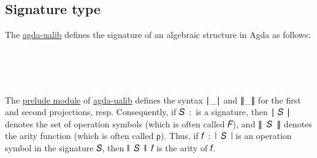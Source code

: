 \documentclass[sigplan,screen]{acmart}
\newcommand\signatureOV{\AgdaFunction{Signature}\AgdaSpace{}\AgdaBound{𝓞}\AgdaSpace{}\AgdaBound{𝓥}}
\newcommand\preludemodule{\href{https://gitlab.com/ualib/ualib.gitlab.io/-/blob/master/prelude.lagda.rst}{prelude module}\xspace}
\newcommand{\agdaualib}{\href{https://ualib.org}{agda-ualib}\xspace}
\newcommand{\agdaualib}{\href{anonymizedLink/agda-ualib.html}{agda-ualib}\xspace}
\newcommand\preludemodule{\href{anonymizedLink/prelude.lagda.rst}{prelude module}\xspace}
\begin{document}
\subsection{Signature type}
The \agdaualib defines the signature of an algebraic structure in Agda as follows:
\begin{code}%
\>[0]\<%
\\
\>[0]\<%
\\
\>[0]\AgdaSpace{}%
\AgdaSymbol{:}\AgdaSpace{}%
\AgdaSymbol{(}\AgdaSpace{}%
\AgdaSpace{}%
\AgdaSymbol{:}\AgdaSpace{}%
\AgdaSymbol{)}\AgdaSpace{}%
\AgdaSpace{}%
\AgdaSpace{}%
\AgdaSpace{}%
\AgdaSpace{}%
\AgdaSpace{}%
\AgdaSpace{}%
\<%
\\
\>[0]\AgdaSpace{}%
\AgdaSpace{}%
\AgdaSpace{}%
\AgdaSymbol{=}\AgdaSpace{}%
\AgdaSpace{}%
\AgdaSpace{}%
\AgdaSpace{}%
\AgdaSpace{}%
%
\>[27]\AgdaFunction{,}\AgdaSpace{}%
\AgdaSymbol{(}\AgdaSpace{}%
\AgdaSpace{}%
\AgdaSpace{}%
\AgdaSpace{}%
\AgdaSpace{}%
\AgdaSymbol{)}\<%
\end{code}
The \preludemodule of \agdaualib defines the syntax ∣\_∣ and ∥\_∥ for the first and second projections, resp.  Consequently, if 𝑆~:~\signatureOV is a signature, then ∣ 𝑆 ∣ denotes the set of operation symbols (which is often called 𝐹), and ∥~𝑆~∥ denotes the arity function (which is often called ρ). Thus, if  𝑓~:~∣~𝑆~∣ is an operation symbol in the signature 𝑆, then ∥~𝑆~∥~𝑓 is the arity of 𝑓.
\end{document}
